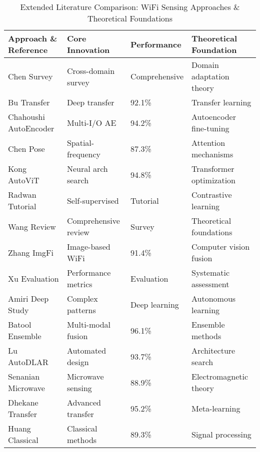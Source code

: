 \documentclass[journal]{IEEEtran}
\begin{document}
\begin{table}[h]
\centering
\caption{Extended Literature Comparison: WiFi Sensing Approaches \& Theoretical Foundations}
\label{tab:extended_literature_comparison}
\begin{tabular}{|p{2.2cm}|p{1.8cm}|p{1.3cm}|p{2.0cm}|}
\hline
\textbf{Approach \& Reference} & \textbf{Core Innovation} & \textbf{Performance} & \textbf{Theoretical Foundation} \\
\hline
Chen Survey \cite{chen2023cross} & Cross-domain survey & Comprehensive & Domain adaptation theory \\
Bu Transfer \cite{bu2022deep} & Deep transfer & 92.1\% & Transfer learning \\
Chahoushi AutoEncoder \cite{chahoushi2023csi} & Multi-I/O AE & 94.2\% & Autoencoder fine-tuning \\
Chen Pose \cite{chen2023seeing} & Spatial-frequency & 87.3\% & Attention mechanisms \\
Kong AutoViT \cite{kong2025autovit} & Neural arch search & 94.8\% & Transformer optimization \\
Radwan Tutorial \cite{radwan2025tutorial} & Self-supervised & Tutorial & Contrastive learning \\
Wang Review \cite{wang2024review} & Comprehensive review & Survey & Theoretical foundations \\
Zhang ImgFi \cite{zhang2023imgfi} & Image-based WiFi & 91.4\% & Computer vision fusion \\
Xu Evaluation \cite{xu2025evaluating} & Performance metrics & Evaluation & Systematic assessment \\
Amiri Deep Study \cite{amiri2024deep} & Complex patterns & Deep learning & Autonomous learning \\
Batool Ensemble \cite{batool2024ensemble} & Multi-modal fusion & 96.1\% & Ensemble methods \\
Lu AutoDLAR \cite{lu2024autodlar} & Automated design & 93.7\% & Architecture search \\
Senanian Microwave \cite{senanian2024microwave} & Microwave sensing & 88.9\% & Electromagnetic theory \\
Dhekane Transfer \cite{dhekane2025transfer} & Advanced transfer & 95.2\% & Meta-learning \\
Huang Classical \cite{huang2020towards} & Classical methods & 89.3\% & Signal processing \\
\hline
\end{tabular}
\end{table}
\end{document}
